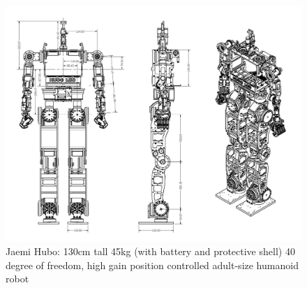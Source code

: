 \begin{figure}[thpb]
  \centering
\includegraphics[width=1.0\columnwidth]{./pix/huboSch.png}
  \caption{Jaemi Hubo: 130cm tall 45kg (with battery and protective shell) 40 degree of freedom, high gain position controlled adult-size humanoid robot }
  \label{fig:huboSch}
\end{figure}









